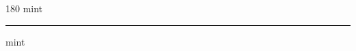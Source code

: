 
\begin{frame}
\begin{center}
\begin{turn}{180}
{\fontsize{2.5cm}{1em}\selectfont mint}
\end{turn}
\vspace{1em}\par  
\hrule
\vspace{1em}\par  
{\fontsize{2.5cm}{1em}\selectfont mint}
\end{center}
\end{frame}
